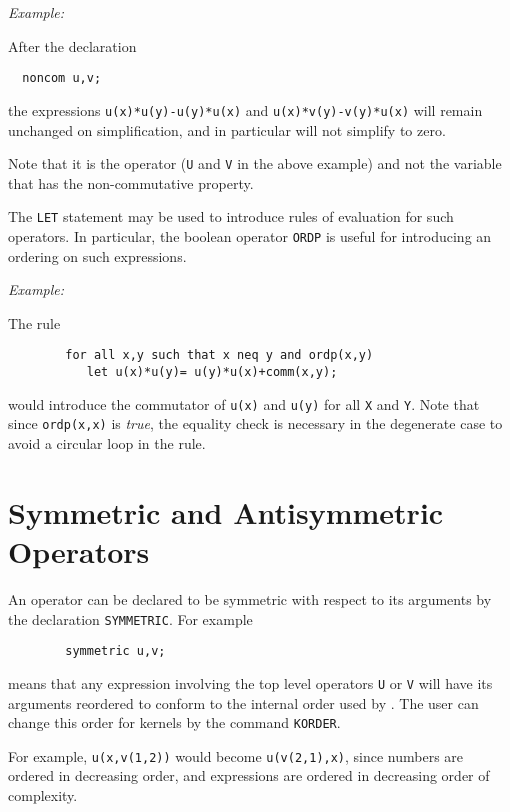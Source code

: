 \textit{Example:}

After the declaration
\begin{verbatim}
  noncom u,v;
\end{verbatim}
the expressions \texttt{u(x)*u(y)-u(y)*u(x)} and \texttt{u(x)*v(y)-v(y)*u(x)} 
will remain unchanged
on simplification, and in particular will not simplify to zero.

Note that it is the operator (\texttt{U} and \texttt{V} in the above example)
and not the variable that has the non-commutative property.

The \texttt{LET} statement may be used to introduce rules of
evaluation for such operators.  In particular, the boolean operator
\texttt{ORDP} is useful for introducing an ordering on such
expressions.

\textit{Example:}

The rule
\begin{verbatim}
        for all x,y such that x neq y and ordp(x,y)
           let u(x)*u(y)= u(y)*u(x)+comm(x,y);
\end{verbatim}
would introduce the commutator of \texttt{u(x)} and \texttt{u(y)} for all
\texttt{X} and \texttt{Y}.  Note that since \texttt{ordp(x,x)} is {\em true}, the
equality check is necessary in the degenerate case to avoid a circular
loop in the rule.

\hypertarget{reserved:SYMMETRIC}{\section{Symmetric and Antisymmetric Operators}}

An operator can be declared to be symmetric with respect to its arguments
by the declaration \texttt{SYMMETRIC}. For example
\begin{verbatim}
        symmetric u,v;
\end{verbatim}
means that any expression involving the top level operators \texttt{U} or
\texttt{V} will have its arguments reordered to conform to the internal order
used by {\REDUCE}.  The user can change this order for kernels by the
command \texttt{KORDER}.

For example, \texttt{u(x,v(1,2))} would become \texttt{u(v(2,1),x)}, since
numbers are ordered in decreasing order, and expressions are ordered in
decreasing order of complexity.

